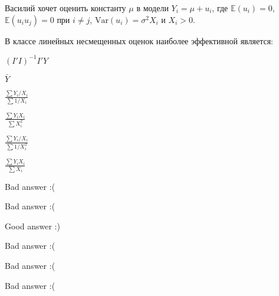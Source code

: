 
\begin{question}
Василий хочет оценить константу \(\mu\) в модели \(Y_i = \mu + u_i\), где \(\mathbb{E}(u_i)=0\), \(\mathbb{E}(u_i u_j)=0\) при \(i\neq j\), \(\mathrm{Var}(u_i)=\sigma^2 X_i\) и \(X_i>0\).

В классе линейных несмещенных оценок наиболее эффективной является:
\begin{answerlist}
  \item \((I'I)^{-1}I'Y\)
  \item \(\bar Y\)
  \item \(\frac{\sum Y_i / X_i}{\sum 1/X_i}\)
  \item \(\frac{\sum Y_i X_i}{\sum X_i^2}\)
  \item \(\frac{\sum Y_i / X_i}{\sum 1/X_i^2}\)
  \item \(\frac{\sum Y_i X_i}{\sum X_i}\)
\end{answerlist}
\end{question}

\begin{solution}
\begin{answerlist}
  \item Bad answer :(
  \item Bad answer :(
  \item Good answer :)
  \item Bad answer :(
  \item Bad answer :(
  \item Bad answer :(
\end{answerlist}
\end{solution}

